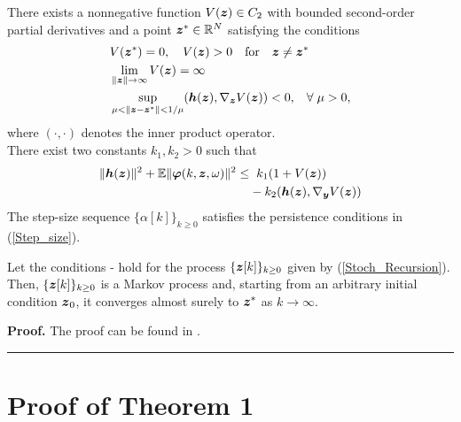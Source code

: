 \documentclass[10pt,twocolumn]{IEEEtran}
\def\bh{\mbox{\boldmath $h$}}
\def\bh{\mbox{\boldmath $h$}}
\def\bz{\mbox{\boldmath $z$}}
\newenvironment{proof}[1][Proof]{\noindent \textbf{#1.} }{\qedsymbol}
\newcommand{\qedsymbol}{\hspace{\fill}\rule{1.5ex}{1.5ex}}
\begin{document}
 There exists a nonnegative function $V(\bz)\in C_2$ with bounded second-order partial derivatives and a point $\bz^*\in \mathbb{R}^{N}$ satisfying the conditions
\begin{align}
\displaystyle &V(\bz^*)=0, \quad V(\bz)>0\quad \hbox{for} \quad \bz\ne\bz^*\\
\displaystyle &\lim_{\|\boldsymbol{z}\|\rightarrow \infty}V(\bz)=\infty\\
\displaystyle &\sup_{\mu<\|\boldsymbol{z}-\boldsymbol{z}^*\|<1/\mu}(\bh(\bz),\mathbf{\nabla}_{\boldsymbol{z}}V(\bz))<0, \hspace{.3cm}\forall\hspace{.1cm} \mu>0, \label{Lyap_cond}
\end{align}
where $(\cdot,\cdot)$ denotes the inner product operator.\\
 There exist two constants $k_1,k_2>0$ such that
\begin{align}
\|\bh(\bz)\|^2+\mathbb{E}\|\boldsymbol{\varphi}(k,\bz,\omega)\|^2\leq& \;\; k_1(1+V(\bz))\nonumber\\ &-k_2(\bh(\bz),\mathbf{\nabla}_{\boldsymbol{y}}V(\bz)) \label{Bound_variance}
\end{align}
 The step-size sequence $\{\alpha[k]\}_{k\geq0}$ satisfies the persistence conditions in (\ref{Step_size}).

Let the conditions - hold for the process $\{\bz[k]\}_{k\geq0}$ given by (\ref{Stoch_Recursion}). Then, $\{\bz[k]\}_{k\geq0}$ is a Markov process and, starting from an arbitrary initial condition $\bz_0$, it converges almost surely to $\bz^*$ as $k\rightarrow \infty$.

\begin{proof}
The proof can be found in \cite{Nevel}.
\end{proof}



\section{Proof of Theorem 1}
\end{document}
